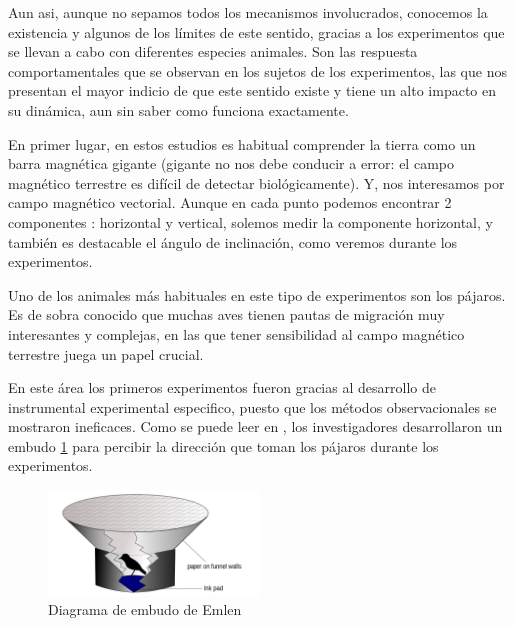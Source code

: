 \documentclass[1p]{elsarticle}
\begin{document}
Aun asi, aunque no sepamos todos los mecanismos involucrados, conocemos la existencia y algunos de los límites de este sentido, gracias a los experimentos que se llevan a cabo con diferentes especies animales. Son las respuesta comportamentales que se observan en los sujetos de los experimentos, las que nos presentan el mayor indicio de que este sentido existe y tiene un alto impacto en su dinámica, aun sin saber como funciona exactamente.

En primer lugar, en estos estudios es habitual comprender la tierra como un barra magnética gigante (gigante no nos debe conducir a error: el campo magnético terrestre es difícil de detectar biológicamente). Y, nos interesamos por campo magnético vectorial. Aunque en cada punto podemos encontrar 2 componentes : horizontal y vertical, solemos medir la componente horizontal, y también es destacable el ángulo de inclinación, como veremos durante los experimentos. 

Uno de los animales más habituales en este tipo de experimentos son los pájaros. Es de sobra conocido que muchas aves tienen pautas de migración muy interesantes y complejas, en las que tener sensibilidad al campo magnético terrestre juega un papel crucial.

 En este área los primeros experimentos fueron gracias al desarrollo de instrumental experimental especifico, puesto que los métodos observacionales se mostraron ineficaces. Como se puede leer en \cite{embudo}, los investigadores desarrollaron un embudo \ref{embudo_1} para percibir la dirección que toman los pájaros durante los experimentos. 
  \begin{figure}
  	\centering
  	\includegraphics[width=0.5\textwidth]{emlen_funnel}
  	\caption{Diagrama de embudo de Emlen}
  	\label{embudo_1}
  \end{figure}
  
\end{document}
